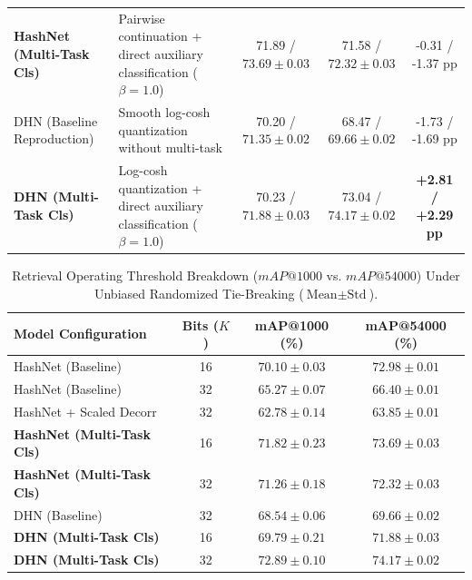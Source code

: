 \documentclass[10pt,conference]{IEEEtran}
\begin{document}
\begin{table}[t]
\begin{tabular}{llccc}
\textbf{HashNet (Multi-Task Cls)} & Pairwise continuation + direct auxiliary classification ($\beta=1.0$) & 71.89 / $\mathbf{73.69 \pm 0.03}$ & 71.58 / $\mathbf{72.32 \pm 0.03}$ & -0.31 / -1.37 pp \\
DHN (Baseline Reproduction) & Smooth log-cosh quantization without multi-task & 70.20 / $71.35 \pm 0.02$ & 68.47 / $69.66 \pm 0.02$ & -1.73 / -1.69 pp \\
\textbf{DHN (Multi-Task Cls)} & Log-cosh quantization + direct auxiliary classification ($\beta=1.0$) & 70.23 / $\mathbf{71.88 \pm 0.03}$ & 73.04 / $\mathbf{74.17 \pm 0.02}$ & \textbf{+2.81 / +2.29 pp} \\
\bottomrule
\end{tabular}
\end{table}

\begin{table}[h]
\centering
\caption{Retrieval Operating Threshold Breakdown ($mAP@1000$ vs. $mAP@54000$) Under Unbiased Randomized Tie-Breaking ($\text{Mean} \pm \text{Std}$).}
\label{tab:threshold_results}
\begin{tabular}{lccc}
\toprule
\textbf{Model Configuration} & \textbf{Bits ($K$)} & \textbf{mAP@1000 (\%)} & \textbf{mAP@54000 (\%)} \\
\midrule
HashNet (Baseline) & 16 & $70.10 \pm 0.03$ & $72.98 \pm 0.01$ \\
HashNet (Baseline) & 32 & $65.27 \pm 0.07$ & $66.40 \pm 0.01$ \\
\midrule
HashNet + Scaled Decorr & 32 & $62.78 \pm 0.14$ & $63.85 \pm 0.01$ \\
\midrule
\textbf{HashNet (Multi-Task Cls)} & 16 & $\mathbf{71.82 \pm 0.23}$ & $\mathbf{73.69 \pm 0.03}$ \\
\textbf{HashNet (Multi-Task Cls)} & 32 & $\mathbf{71.26 \pm 0.18}$ & $\mathbf{72.32 \pm 0.03}$ \\
\midrule
DHN (Baseline) & 32 & $68.54 \pm 0.06$ & $69.66 \pm 0.02$ \\
\textbf{DHN (Multi-Task Cls)} & 16 & $69.79 \pm 0.21$ & $71.88 \pm 0.03$ \\
\textbf{DHN (Multi-Task Cls)} & 32 & $\mathbf{72.89 \pm 0.10}$ & $\mathbf{74.17 \pm 0.02}$ \\
\bottomrule
\end{tabular}
\end{table}
\end{document}
